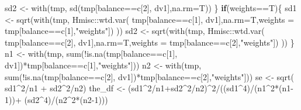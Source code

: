 \documentclass[
]{article}
\newenvironment{Shaded}{\begin{snugshade}}{\end{snugshade}}
\newcommand{\AttributeTok}[1]{\textcolor[rgb]{0.77,0.63,0.00}{#1}}
\newcommand{\ControlFlowTok}[1]{\textcolor[rgb]{0.13,0.29,0.53}{\textbf{#1}}}
\newcommand{\DecValTok}[1]{\textcolor[rgb]{0.00,0.00,0.81}{#1}}
\newcommand{\FunctionTok}[1]{\textcolor[rgb]{0.00,0.00,0.00}{#1}}
\newcommand{\NormalTok}[1]{#1}
\newcommand{\OtherTok}[1]{\textcolor[rgb]{0.56,0.35,0.01}{#1}}
\newcommand{\SpecialCharTok}[1]{\textcolor[rgb]{0.00,0.00,0.00}{#1}}
\newcommand{\StringTok}[1]{\textcolor[rgb]{0.31,0.60,0.02}{#1}}
\begin{document}
\begin{Shaded}
\begin{Highlighting}[]
\NormalTok{    sd2 }\OtherTok{\textless{}{-}} \FunctionTok{with}\NormalTok{(tmp, }\FunctionTok{sd}\NormalTok{(tmp[balance}\SpecialCharTok{==}\NormalTok{c[}\DecValTok{2}\NormalTok{], dv1],}\AttributeTok{na.rm=}\NormalTok{T))}
\NormalTok{  \}}
  \ControlFlowTok{if}\NormalTok{(weights}\SpecialCharTok{==}\NormalTok{T)\{}
\NormalTok{    sd1 }\OtherTok{\textless{}{-}} \FunctionTok{sqrt}\NormalTok{(}\FunctionTok{with}\NormalTok{(tmp, Hmisc}\SpecialCharTok{::}\FunctionTok{wtd.var}\NormalTok{(}
\NormalTok{      tmp[balance}\SpecialCharTok{==}\NormalTok{c[}\DecValTok{1}\NormalTok{], dv1],}\AttributeTok{na.rm=}\NormalTok{T,}\AttributeTok{weights =}\NormalTok{ tmp[balance}\SpecialCharTok{==}\NormalTok{c[}\DecValTok{1}\NormalTok{],}\StringTok{"weights"}\NormalTok{])}
\NormalTok{      ))}
\NormalTok{    sd2 }\OtherTok{\textless{}{-}} \FunctionTok{sqrt}\NormalTok{(}\FunctionTok{with}\NormalTok{(tmp, Hmisc}\SpecialCharTok{::}\FunctionTok{wtd.var}\NormalTok{(}
\NormalTok{      tmp[balance}\SpecialCharTok{==}\NormalTok{c[}\DecValTok{2}\NormalTok{], dv1],}\AttributeTok{na.rm=}\NormalTok{T,}\AttributeTok{weights =}\NormalTok{ tmp[balance}\SpecialCharTok{==}\NormalTok{c[}\DecValTok{2}\NormalTok{],}\StringTok{"weights"}\NormalTok{])}
\NormalTok{      ))}
\NormalTok{  \}}
\NormalTok{  n1 }\OtherTok{\textless{}{-}} \FunctionTok{with}\NormalTok{(tmp, }\FunctionTok{sum}\NormalTok{(}\SpecialCharTok{!}\FunctionTok{is.na}\NormalTok{(tmp[balance}\SpecialCharTok{==}\NormalTok{c[}\DecValTok{1}\NormalTok{], dv1])}\SpecialCharTok{*}\NormalTok{tmp[balance}\SpecialCharTok{==}\NormalTok{c[}\DecValTok{1}\NormalTok{],}\StringTok{"weights"}\NormalTok{]))}
\NormalTok{  n2 }\OtherTok{\textless{}{-}} \FunctionTok{with}\NormalTok{(tmp, }\FunctionTok{sum}\NormalTok{(}\SpecialCharTok{!}\FunctionTok{is.na}\NormalTok{(tmp[balance}\SpecialCharTok{==}\NormalTok{c[}\DecValTok{2}\NormalTok{], dv1])}\SpecialCharTok{*}\NormalTok{tmp[balance}\SpecialCharTok{==}\NormalTok{c[}\DecValTok{2}\NormalTok{],}\StringTok{"weights"}\NormalTok{]))}
\NormalTok{  se }\OtherTok{\textless{}{-}} \FunctionTok{sqrt}\NormalTok{( sd1}\SpecialCharTok{\^{}}\DecValTok{2}\SpecialCharTok{/}\NormalTok{n1 }\SpecialCharTok{+}\NormalTok{ sd2}\SpecialCharTok{\^{}}\DecValTok{2}\SpecialCharTok{/}\NormalTok{n2)}
\NormalTok{  the\_df }\OtherTok{\textless{}{-}}\NormalTok{ (sd1}\SpecialCharTok{\^{}}\DecValTok{2}\SpecialCharTok{/}\NormalTok{n1}\SpecialCharTok{+}\NormalTok{sd2}\SpecialCharTok{\^{}}\DecValTok{2}\SpecialCharTok{/}\NormalTok{n2)}\SpecialCharTok{\^{}}\DecValTok{2}\SpecialCharTok{/}\NormalTok{((sd1}\SpecialCharTok{\^{}}\DecValTok{4}\NormalTok{)}\SpecialCharTok{/}\NormalTok{(n1}\SpecialCharTok{\^{}}\DecValTok{2}\SpecialCharTok{*}\NormalTok{(n1}\DecValTok{{-}1}\NormalTok{))}\SpecialCharTok{+}\NormalTok{ (sd2}\SpecialCharTok{\^{}}\DecValTok{4}\NormalTok{)}\SpecialCharTok{/}\NormalTok{(n2}\SpecialCharTok{\^{}}\DecValTok{2}\SpecialCharTok{*}\NormalTok{(n2}\DecValTok{{-}1}\NormalTok{)))}

\end{Highlighting}
\end{Shaded}
\end{document}
